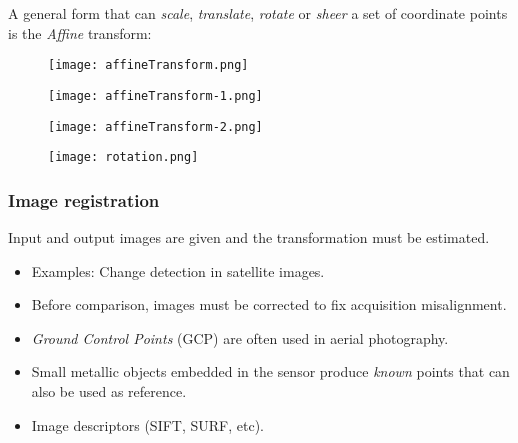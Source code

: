 
\begin{frame}
A general form that can \textit{scale}, \textit{translate}, \textit{rotate} or \textit{sheer} a set of coordinate points is the \textit{Affine} transform:
\begin{figure}
\centering
\texttt{[image: affineTransform.png]}
\end{figure}
\end{frame}


\begin{frame}
\begin{figure}
\centering
\texttt{[image: affineTransform-1.png]}
\end{figure}
\end{frame}


\begin{frame}
\begin{figure}
\centering
\texttt{[image: affineTransform-2.png]}
\end{figure}
\end{frame}


\begin{frame}
\begin{figure}
\centering
\texttt{[image: rotation.png]}
\end{figure}
\end{frame}


\begin{frame}
\frametitle{Image registration}
Input and output images are given and the transformation must be estimated.
\begin{itemize}
\item Examples: Change detection in satellite images.
\item Before comparison, images must be corrected to fix acquisition misalignment.
\item \textit{Ground Control Points} (GCP) are often used in aerial photography.
\item Small metallic objects embedded in the sensor produce \textit{known} points that can also be used as reference.
\item Image descriptors (SIFT, SURF, etc).
\end{itemize}
\end{frame}

